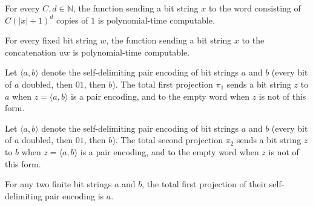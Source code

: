 \begin{theorem}
\label{Complexity.polyTimeComputable_polyUnary}
\leanok
{}
For every $C,d\in\mathbb{N}$, the function sending a bit string $x$ to the word
consisting of $C(|x|+1)^d$ copies of $1$ is polynomial-time computable.
\end{theorem}

\begin{theorem}
\label{Complexity.polyTimeComputable_prepend}
\leanok
{}
For every fixed bit string $w$, the function sending a bit string $x$ to the
concatenation $wx$ is polynomial-time computable.
\end{theorem}

\begin{definition}
\label{Complexity.pairFstD}
\leanok
{}
Let $\langle a,b\rangle$ denote the self-delimiting pair encoding of bit strings $a$ and $b$ (every bit of $a$ doubled, then $01$, then $b$). The total first projection $\pi_1$ sends a bit string $z$ to $a$ when $z = \langle a,b\rangle$ is a pair encoding, and to the empty word when $z$ is not of this form.
\end{definition}

\begin{definition}
\label{Complexity.pairSndD}
\leanok
{}
Let $\langle a,b\rangle$ denote the self-delimiting pair encoding of bit strings $a$ and $b$ (every bit of $a$ doubled, then $01$, then $b$). The total second projection $\pi_2$ sends a bit string $z$ to $b$ when $z = \langle a,b\rangle$ is a pair encoding, and to the empty word when $z$ is not of this form.
\end{definition}

\begin{theorem}
\label{Complexity.pairFstD_pairEncode}
\leanok
{}
For any two finite bit strings $a$ and $b$, the total first projection of their
self-delimiting pair encoding is $a$.
\end{theorem}


